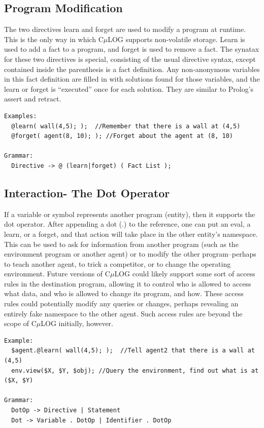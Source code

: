 \documentclass[onecolumn,titlepage]{article}
\begin{document}
\subsection{Program Modification}
The two directives learn and forget are used to modify a program at
runtime.  This is the only way in which C$\mu$LOG supports
non-volatile storage.  Learn is used to add a fact to a program, and
forget is used to remove a fact.  The synatax for these two directives
is special, consisting of the usual directive syntax, except contained
inside the parenthesis is a fact definition.  Any non-anonymous
variables in this fact definition are filled in with solutions found
for those variables, and the learn or forget is ``executed'' once for
each solution.  They are similar to Prolog's assert and retract.
\begin{verbatim}
Examples:
  @learn( wall(4,5); );  //Remember that there is a wall at (4,5)
  @forget( agent(8, 10); ); //Forget about the agent at (8, 10)

Grammar:
  Directive -> @ (learn|forget) ( Fact List ); 
\end{verbatim}


\subsection{Interaction- The Dot Operator}
If a variable or symbol represents another program (entity), then it supports
the dot operator.  After appending a dot (.) to the reference, one can put
an eval, a learn, or a forget, and that action will take place in the other
entity's namespace.  This can be used to ask for information from another program
(such as the environment program or another agent) or to modify the other
program--perhaps to teach another agent, to trick a competitor, or to change
the operating environment.  Future versions of C$\mu$LOG could likely support
some sort of access rules in the destination program, allowing it to control who is
allowed to access what data, and who is allowed to change its program, and how.
These access rules could potentially modify any queries or changes, perhaps
revealing an entirely fake namespace to the other agent.  Such access rules are
beyond the scope of C$\mu$LOG initially, however.
\begin{verbatim}
Example:
  $agent.@learn( wall(4,5); );  //Tell agent2 that there is a wall at (4,5)
  env.view($X, $Y, $obj); //Query the environment, find out what is at ($X, $Y)

Grammar:
  DotOp -> Directive | Statement
  Dot -> Variable . DotOp | Identifier . DotOp
\end{verbatim}
\end{document}
